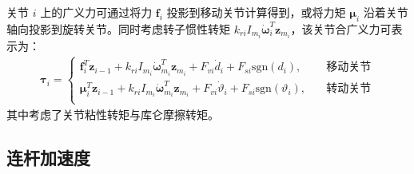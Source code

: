 \documentclass[cn,11pt,chinese,blue,bibstyle=ieeetr]{elegantbook}
\begin{document}
关节 $i$ 上的广义力可通过将力 $\bm{f}_i$ 投影到移动关节计算得到，或将力矩 $\bm{\mu}_i$ 沿着关节轴向投影到旋转关节。同时考虑转子惯性转矩 $k_{ri}I_{m_i}\bm{\dot{\omega}}_i^T\bm{z}_{m_i}$，该关节合广义力可表示为：
\begin{equation}\label{joint_total_generalized_force}
\begin{aligned}
\bm{\tau}_i =
\begin{cases}
\bm{f}_i^T\bm{z}_{i-1} + k_{ri}I_{m_i}\bm{\dot{\omega}}_{m_i}^T\bm{z}_{m_i} + {F}_{vi}\dot{d}_i + {F}_{si}\text{sgn}(d_i), \quad &\text{移动关节} \\
\bm{\mu}_i^T\bm{z}_{i-1} + k_{ri}I_{m_i}\bm{\dot{\omega}}_{m_i}^T\bm{z}_{m_i} + {F}_{vi}\dot{\vartheta}_i + {F}_{si}\text{sgn}(\vartheta_i), \quad &\text{转动关节} \\
\end{cases}
\end{aligned}
\end{equation}
其中考虑了关节粘性转矩与库仑摩擦转矩。

\subsection{连杆加速度}
\end{document}
